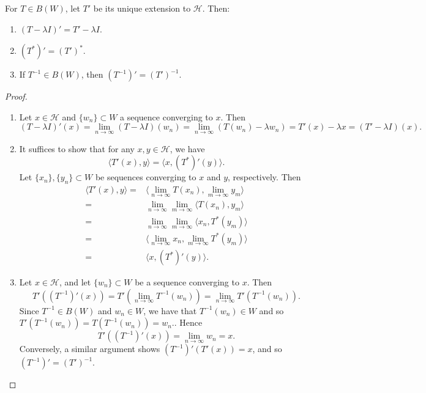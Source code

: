 \documentclass[12pt]{article}
\begin{document}
\begin{proposition}
\label{prop_extension_properties}
	For $T\in B(W)$, let $T'$ be its unique extension to $\mathcal{H}$. Then:
	\begin{enumerate}
		\item $(T-\lambda I)' = T' - \lambda I$.
		\item $(T^\ast)' = (T')^\ast$.
		\item If $T^{-1}\in B(W)$, then $(T^{-1})' = (T')^{-1}$.
	\end{enumerate}
\end{proposition}
\begin{proof}
	\hfill
	\begin{enumerate}
		\item Let $x\in\mathcal{H}$ and $\{w_n\}\subset W$ a sequence converging to $x$. Then 
			\begin{equation*}
				(T-\lambda I)'(x) = \lim_{n\to\infty} (T-\lambda I)(w_n) = \lim_{n\to\infty} (T(w_n) - \lambda w_n) = T'(x) - \lambda x = (T'-\lambda I)(x).
			\end{equation*}
		\item It suffices to show that for any $x,y\in\mathcal{H}$, we have
			\begin{equation*}
				\langle T'(x), y \rangle = \langle x, (T^\ast)'(y) \rangle.
			\end{equation*}
			Let $\{x_n\}, \{y_n\}\subset W$ be sequences converging to $x$ and $y$, respectively. Then 
			\begin{align*}
				\langle T'(x), y \rangle =& \langle \lim_{n\to\infty}T(x_n), \lim_{m\to\infty}y_m \rangle \\
				=& \lim_{n\to\infty} \lim_{m\to\infty} \langle T(x_n), y_m \rangle \\
				=& \lim_{n\to\infty} \lim_{m\to\infty} \langle x_n, T^\ast(y_m) \rangle \\
				=& \langle \lim_{n\to\infty} x_n, \lim_{m\to\infty} T^\ast(y_m) \rangle \\
				=& \langle x, (T^\ast)'(y) \rangle.
			\end{align*}
		\item Let $x\in \mathcal{H}$, and let $\{w_n\}\subset W$ be a sequence converging to $x$. Then 
			\begin{equation*}
				T'((T^{-1})'(x))=T'(\lim_{n\to\infty}T^{-1}(w_n))=\lim_{n\to\infty} T'(T^{-1}(w_n)).
			\end{equation*}
			Since $T^{-1}\in B(W)$ and $w_n\in W$, we have that $T^{-1}(w_n)\in W$ and so $T'(T^{-1}(w_n))=T(T^{-1}(w_n))= w_n.$. Hence 
			\begin{equation*}
				T'((T^{-1})'(x)) = \lim_{n\to\infty} w_n = x.
			\end{equation*}
			Conversely, a similar argument shows $(T^{-1})'(T'(x)) = x$, and so $(T^{-1})' = (T')^{-1}$.
	\end{enumerate}
\end{proof}
\end{document}
